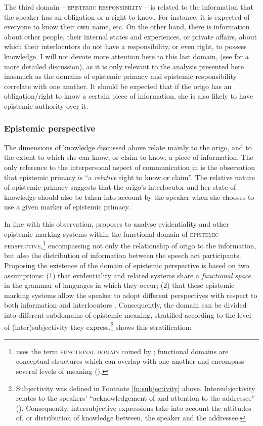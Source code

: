 \documentclass[output=paper]{langscibook}
\begin{document}
The third domain – \textsc{epistemic responsibility} – is related to the information that the speaker has an obligation or a right to know. For instance, it is expected of everyone to know their own name, etc. On the other hand, there is information about other people, their internal states and experiences, or private affairs, about which their interlocutors do not have a responsibility, or even right, to possess knowledge. I will not devote more attention here to this last domain, (see \citealt[ch.5]{Grzech2016a} for a more detailed discussion), as it is only relevant to the analysis presented here inasmuch as the domains of epistemic primacy and epistemic responsibility correlate with one another. It should be expected that if the origo has an obligation/right to know a certain piece of information, she is also likely to have epistemic authority over it.


\subsubsection{Epistemic perspective}\label{s:kg1-3-3}

The dimensions of knowledge discussed above relate mainly to the origo, and to the extent to which she can know, or claim to know, a piece of information. The only reference to the interpersonal aspect of communication in  is the observation that epistemic primacy is “a \emph{relative} right to know or claim”. The relative nature of epistemic primacy suggests that the origo’s interlocutor and her state of knowledge should also be taken into account by the speaker when she chooses to use a given marker of epistemic primacy.

In line with this observation, \cite{Bergqvist2017} proposes to analyse evidentiality and other epistemic marking systems within the functional domain of \textsc{epistemic perspective},\footnote{\cite{Bergqvist2017} uses the term \textsc{functional domain} coined by \cite{Givon1981}; functional domains are conceptual structures which can overlap with one another and encompass several levels of meaning (\citealt[11]{Bergqvist2017}).} encompassing not only the relationship of origo to the information, but also the distribution of information between the speech act participants. Proposing the existence of the domain of epistemic perspective is based on two assumptions: (1) that evidentiality and related systems share a \emph{functional space} in the grammar of languages in which they occur; (2) that these epistemic marking systems allow the speaker to adopt different perspectives with respect to both information and interlocutors \citet[11]{Bergqvist2017}. Consequently, the domain can be divided into different subdomains of epistemic meaning, stratified according to the level of (inter)subjectivity they express.\footnote{Subjectivity was defined in Footnote \ref{fn:subjectivity} above. Intersubjectivity relates to the speakers’ “acknowledgement of and attention to the addressee” (\citealt[2]{Traugott2010}). Consequently, intersubjective expressions take into account the attitudes of, or distribution of knowledge between, the speaker and the addressee.}  shows this stratification:
\end{document}

